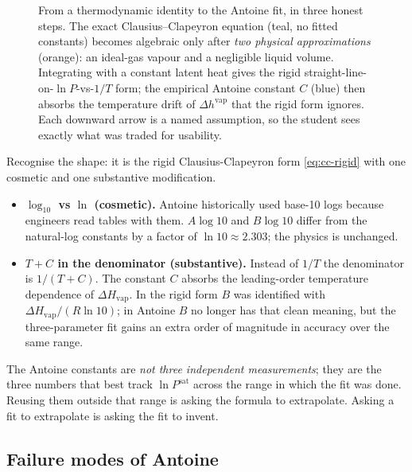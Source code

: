\documentclass[11pt,a4paper]{article}
\newcommand{\Hvap}{\Delta H_{\!\mathrm{vap}}}
\begin{document}
\begin{figure}[ht]
\caption{From a thermodynamic identity to the Antoine fit, in three
honest steps.  The exact Clausius--Clapeyron equation (teal, no fitted
constants) becomes algebraic only after \emph{two physical
approximations} (orange): an ideal-gas vapour and a negligible liquid
volume.  Integrating with a constant latent heat gives the rigid
straight-line-on-$\ln P$-vs-$1/T$ form; the empirical Antoine constant
$C$ (blue) then absorbs the temperature drift of $\Delta h^{\mathrm{vap}}$
that the rigid form ignores.  Each downward arrow is a named assumption,
so the student sees exactly what was traded for usability.}
\label{fig:antoine-derivation}
\end{figure}

Recognise the shape: it is the rigid Clausius-Clapeyron form
\eqref{eq:cc-rigid} with one cosmetic and one substantive
modification.

\begin{itemize}[leftmargin=*,nosep]
  \item \textbf{$\log_{10}$ vs $\ln$ (cosmetic).}  Antoine
        historically used base-10 logs because engineers read tables
        with them.  $A \log 10$ and $B \log 10$ differ from the
        natural-log constants by a factor of $\ln 10 \approx 2.303$;
        the physics is unchanged.
  \item \textbf{$T + C$ in the denominator (substantive).}  Instead
        of $1/T$ the denominator is $1/(T + C)$.  The constant
        $C$ absorbs the leading-order temperature dependence of
        $\Hvap$.  In the rigid form $B$ was identified with
        $\Hvap / (R \ln 10)$; in Antoine $B$ no longer has that
        clean meaning, but the three-parameter fit gains an extra
        order of magnitude in accuracy over the same range.
\end{itemize}

\begin{intuition}
The Antoine constants are \emph{not three independent measurements};
they are the three numbers that best track $\ln P^{\mathrm{sat}}$
across the range in which the fit was done.  Reusing them outside
that range is asking the formula to extrapolate.  Asking a fit to
extrapolate is asking the fit to invent.
\end{intuition}

\subsection{Failure modes of Antoine}
\end{document}
